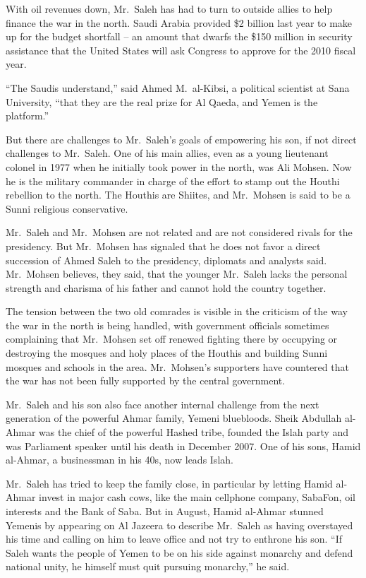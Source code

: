 ﻿\documentclass[12pt]{article}
\begin{document}
With oil revenues down, Mr.~Saleh has had to turn to outside allies to help finance the war in the
north. Saudi Arabia provided \$2 billion last year to make up for the budget shortfall -- an amount
that dwarfs the \$150 million in security assistance that the United States will ask Congress to
approve for the 2010 fiscal year.

``The Saudis understand,'' said Ahmed M.~al-Kibsi, a political scientist at Sana University, ``that
they are the real prize for Al Qaeda, and Yemen is the platform.''

But there are challenges to Mr.~Saleh's goals of empowering his son, if not direct challenges to
Mr.~Saleh. One of his main allies, even as a young lieutenant colonel in 1977 when he initially took
power in the north, was Ali Mohsen. Now he is the military commander in charge of the effort to
stamp out the Houthi rebellion to the north. The Houthis are Shiites, and Mr.~Mohsen is said to be a
Sunni religious conservative.

Mr.~Saleh and Mr.~Mohsen are not related and are not considered rivals for the presidency. But
Mr.~Mohsen has signaled that he does not favor a direct succession of Ahmed Saleh to the presidency,
diplomats and analysts said. Mr.~Mohsen believes, they said, that the younger Mr.~Saleh lacks the
personal strength and charisma of his father and cannot hold the country together.

The tension between the two old comrades is visible in the criticism of the way the war in the north
is being handled, with government officials sometimes complaining that Mr.~Mohsen set off renewed
fighting there by occupying or destroying the mosques and holy places of the Houthis and building
Sunni mosques and schools in the area. Mr.~Mohsen's supporters have countered that the war has not
been fully supported by the central government.

Mr.~Saleh and his son also face another internal challenge from the next generation of the powerful
Ahmar family, Yemeni bluebloods. Sheik Abdullah al-Ahmar was the chief of the powerful Hashed tribe,
founded the Islah party and was Parliament speaker until his death in December 2007. One of his
sons, Hamid al-Ahmar, a businessman in his 40s, now leads Islah.

Mr.~Saleh has tried to keep the family close, in particular by letting Hamid al-Ahmar invest in
major cash cows, like the main cellphone company, SabaFon, oil interests and the Bank of Saba. But
in August, Hamid al-Ahmar stunned Yemenis by appearing on Al Jazeera to describe Mr.~Saleh as having
overstayed his time and calling on him to leave office and not try to enthrone his son. ``If Saleh
wants the people of Yemen to be on his side against monarchy and defend national unity, he himself
must quit pursuing monarchy,'' he said.
\end{document}
